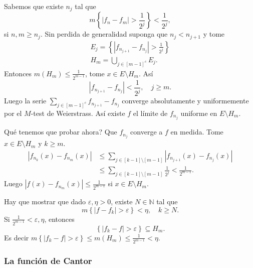 \documentclass[12pt]{article}
\theoremstyle{plain}
\theoremstyle{definition}
\theoremstyle{remark}
\numberwithin{equation}{section}
\newcommand{\bN}{\mathbb{N}}        %
\renewcommand{\geq}{\geqslant}      %
\renewcommand{\leq}{\leqslant}      %
\renewcommand{\:}{\colon}           %
\newcommand{\conj}[1]{\left\lbrace#1\right\rbrace}
\newcommand{\bonj}[1]{\left\lbrack#1\right\rbrack}
\begin{document}
\begin{multicols}{2}
\begin{ptcbp}
Sabemos que existe $n_j$ tal que
$$m\conj{|f_n-f_m|>\frac{1}{2^j}}<\frac{1}{2^j},$$
si $n,m\geq n_j$. Sin perdida de generalidad suponga que $n_j<n_{j+1}$ y tome
\begin{gather*}
  E_j=\conj{|f_{n_{j+1}}-f_{n_j}|>\frac{1}{2^j}}\\
  H_m=\bigcup_{j\in\bonj{m-1}^c} E_j.
\end{gather*}
Entonces $m(H_m)\leq \frac{1}{2^{m-1}}$, tome $x\in E\setminus H_m$. Así
$$|f_{n_{j+1}}-f_{n_j}|<\frac{1}{2^j},\quad j\geq m.$$
Luego la serie $\sum_{j\in\bonj{m-1}^c}f_{n_{j+1}}-f_{n_j}$ converge absolutamente y uniformemente por el $M$-test de Weierstrass. Así existe $f$ el límite de $f_{n_j}$ uniforme en $E\setminus H_m$.\par
Qué tenemos que probar ahora? Que $f_{n_j}$ converge a $f$ en medida. Tome $x\in E\setminus H_m$ y $k\geq m$.
\begin{align*}
  |f_{n_k}(x)-f_{n_m}(x)| &\leq\sum_{j\in\bonj{k-1}\setminus\bonj{m-1}}|f_{n_{j+1}}(x)-f_{n_j}(x)|\\
  &\leq\sum_{j\in\bonj{k-1}\setminus\bonj{m-1}}\frac{1}{2^j}<\frac{1}{2^{m-1}}.
\end{align*}
 Luego $|f(x)-f_{n_m}(x)|\leq\frac{1}{2^{m-1}}$ si $x\in E\setminus H_m$. \par
Hay que mostrar que dado $\varepsilon,\eta>0$, existe $N\in\bN$ tal que
$$m\conj{|f-f_k|>\varepsilon}<\eta,\quad k\geq N.$$
Si $\frac{1}{2^{m-1}}<\varepsilon,\eta$, entonces
$$\conj{|f_k-f|>\varepsilon}\subseteq H_m.$$
Es decir $m\conj{|f_k-f|>\varepsilon}\leq m(H_m)\leq \frac{1}{2^{m-1}}<\eta$.
\end{ptcbp}

\subsubsection*{La función de Cantor}


\end{multicols}
\end{document}
